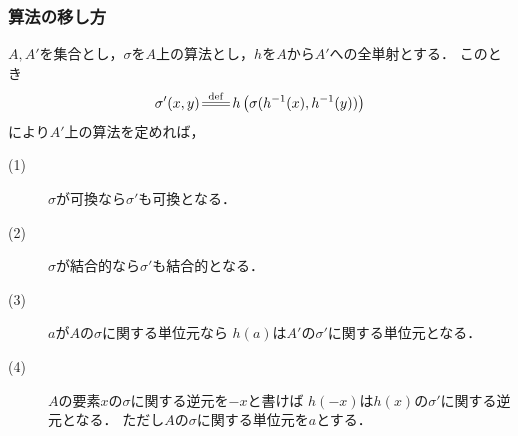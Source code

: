 \subsubsection{算法の移し方}
	$A,A'$を集合とし，$\sigma$を$A$上の算法とし，$h$を$A$から$A'$への全単射とする．
	このとき
	\begin{align}
		\sigma'(x,y) \defeq h\left(\sigma(h^{-1}(x),h^{-1}(y))\right)
	\end{align}
	により$A'$上の算法を定めれば，
	\begin{description}
		\item[(1)] $\sigma$が可換なら$\sigma'$も可換となる．
		\item[(2)] $\sigma$が結合的なら$\sigma'$も結合的となる．
		\item[(3)] $a$が$A$の$\sigma$に関する単位元なら
			$h(a)$は$A'$の$\sigma'$に関する単位元となる．
		\item[(4)] $A$の要素$x$の$\sigma$に関する逆元を$-x$と書けば
			$h(-x)$は$h(x)$の$\sigma'$に関する逆元となる．
			ただし$A$の$\sigma$に関する単位元を$a$とする．
	\end{description}
	
